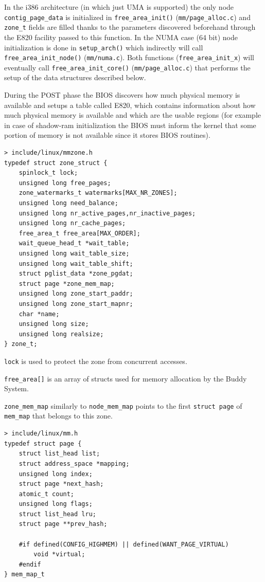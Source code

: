 \documentclass[twoside]{article}
\begin{document}
In the i386 architecture (in which just UMA is supported) the only node
\texttt{contig_page_data} is initialized in \texttt{free_area_init()}
(\texttt{mm/page_alloc.c}) and \texttt{zone_t} fields are filled thanks to the
parameters discovered beforehand through the E820 facility passed to this
function. In the NUMA case (64 bit) node initialization is done in \texttt{setup_arch()} which
indirectly will call \texttt{free_area_init_node()} (\texttt{mm/numa.c}). Both
functions (\texttt{free_area_init_x}) will eventually call
\texttt{free_area_init_core()} (\texttt{mm/page_alloc.c}) that performs the
setup of the data structures described below.

During the POST phase the BIOS discovers how much physical memory is
available and setups a table called E820, which contains information about how
much physical memory is available and which are the usable regions
(for example in case of shadow-ram initialization the BIOS must inform the
kernel that some portion of memory is not available since it stores BIOS
routines).

\newpage

\begin{verbatim}
> include/linux/mmzone.h
typedef struct zone_struct {
    spinlock_t lock;
    unsigned long free_pages;
    zone_watermarks_t watermarks[MAX_NR_ZONES];
    unsigned long need_balance;
    unsigned long nr_active_pages,nr_inactive_pages;
    unsigned long nr_cache_pages;
    free_area_t free_area[MAX_ORDER];
    wait_queue_head_t *wait_table;
    unsigned long wait_table_size;
    unsigned long wait_table_shift;
    struct pglist_data *zone_pgdat;
    struct page *zone_mem_map;
    unsigned long zone_start_paddr;
    unsigned long zone_start_mapnr;
    char *name;
    unsigned long size;
    unsigned long realsize;
} zone_t;
\end{verbatim}

\texttt{lock} is used to protect the zone from concurrent accesses.

\texttt{free_area[]} is an array of structs used for memory allocation by the
Buddy System.

\texttt{zone_mem_map} similarly to \texttt{node_mem_map} points to the first
\texttt{struct page} of \texttt{mem_map} that belongs to this zone.

\begin{verbatim}
> include/linux/mm.h
typedef struct page {
    struct list_head list;
    struct address_space *mapping;
    unsigned long index;
    struct page *next_hash;
    atomic_t count;
    unsigned long flags;
    struct list_head lru;
    struct page **prev_hash;

    #if defined(CONFIG_HIGHMEM) || defined(WANT_PAGE_VIRTUAL)
        void *virtual;
    #endif
} mem_map_t
\end{verbatim}
\end{document}
